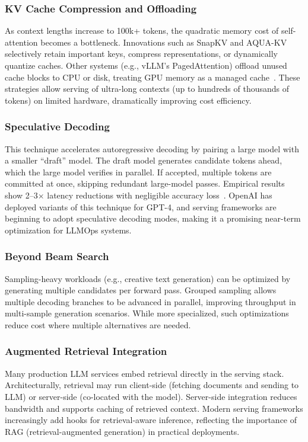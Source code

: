 \subsubsection{KV Cache Compression and Offloading}
As context lengths increase to 100k+ tokens, the quadratic memory cost of self-attention becomes a bottleneck. Innovations such as SnapKV and AQUA-KV selectively retain important keys, compress representations, or dynamically quantize caches. Other systems (e.g., vLLM’s PagedAttention) offload unused cache blocks to CPU or disk, treating GPU memory as a managed cache~\cite{vllm-pagedattention,pagedattention_paper}. These strategies allow serving of ultra-long contexts (up to hundreds of thousands of tokens) on limited hardware, dramatically improving cost efficiency.

\subsubsection{Speculative Decoding}
This technique accelerates autoregressive decoding by pairing a large model with a smaller ``draft'' model. The draft model generates candidate tokens ahead, which the large model verifies in parallel. If accepted, multiple tokens are committed at once, skipping redundant large-model passes. Empirical results show 2--3$\times$ latency reductions with negligible accuracy loss~\cite{Chen2023SpeculativeSampling}. OpenAI has deployed variants of this technique for GPT-4, and serving frameworks are beginning to adopt speculative decoding modes, making it a promising near-term optimization for LLMOps systems.

\subsubsection{Beyond Beam Search}
Sampling-heavy workloads (e.g., creative text generation) can be optimized by generating multiple candidates per forward pass. Grouped sampling allows multiple decoding branches to be advanced in parallel, improving throughput in multi-sample generation scenarios. While more specialized, such optimizations reduce cost where multiple alternatives are needed.

\subsubsection{Augmented Retrieval Integration}
Many production LLM services embed retrieval directly in the serving stack. Architecturally, retrieval may run client-side (fetching documents and sending to LLM) or server-side (co-located with the model). Server-side integration reduces bandwidth and supports caching of retrieved context. Modern serving frameworks increasingly add hooks for retrieval-aware inference, reflecting the importance of RAG (retrieval-augmented generation) in practical deployments.

